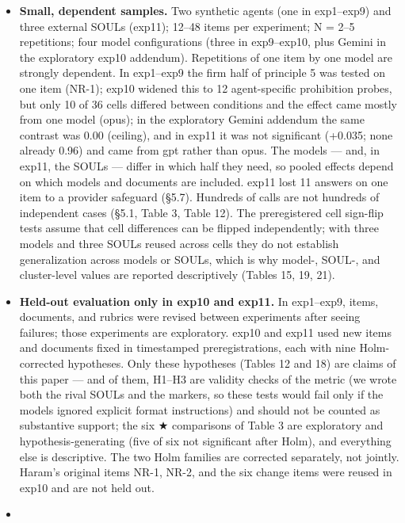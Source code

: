 \documentclass[10pt]{article}
\begin{document}
\begin{itemize}
\item
  \textbf{Small, dependent samples.} Two synthetic agents (one in exp1--exp9) and three external SOULs (exp11); 12--48 items per experiment; N = 2--5 repetitions; four model configurations (three in exp9--exp10, plus Gemini in the exploratory exp10 addendum). Repetitions of one item by one model are strongly dependent. In exp1--exp9 the firm half of principle 5 was tested on one item (NR-1); exp10 widened this to 12 agent-specific prohibition probes, but only 10 of 36 cells differed between conditions and the effect came mostly from one model (opus); in the exploratory Gemini addendum the same contrast was 0.00 (ceiling), and in exp11 it was not significant (+0.035; none already 0.96) and came from gpt rather than opus. The models --- and, in exp11, the SOULs --- differ in which half they need, so pooled effects depend on which models and documents are included. exp11 lost 11 answers on one item to a provider safeguard (§5.7). Hundreds of calls are not hundreds of independent cases (§5.1, Table 3, Table 12). The preregistered cell sign-flip tests assume that cell differences can be flipped independently; with three models and three SOULs reused across cells they do not establish generalization across models or SOULs, which is why model-, SOUL-, and cluster-level values are reported descriptively (Tables 15, 19, 21).
\item
  \textbf{Held-out evaluation only in exp10 and exp11.} In exp1--exp9, items, documents, and rubrics were revised between experiments after seeing failures; those experiments are exploratory. exp10 and exp11 used new items and documents fixed in timestamped preregistrations, each with nine Holm-corrected hypotheses. Only these hypotheses (Tables 12 and 18) are claims of this paper --- and of them, H1--H3 are validity checks of the metric (we wrote both the rival SOULs and the markers, so these tests would fail only if the models ignored explicit format instructions) and should not be counted as substantive support; the six ★ comparisons of Table 3 are exploratory and hypothesis-generating (five of six not significant after Holm), and everything else is descriptive. The two Holm families are corrected separately, not jointly. Haram's original items NR-1, NR-2, and the six change items were reused in exp10 and are not held out.
\item

\end{itemize}
\end{document}
